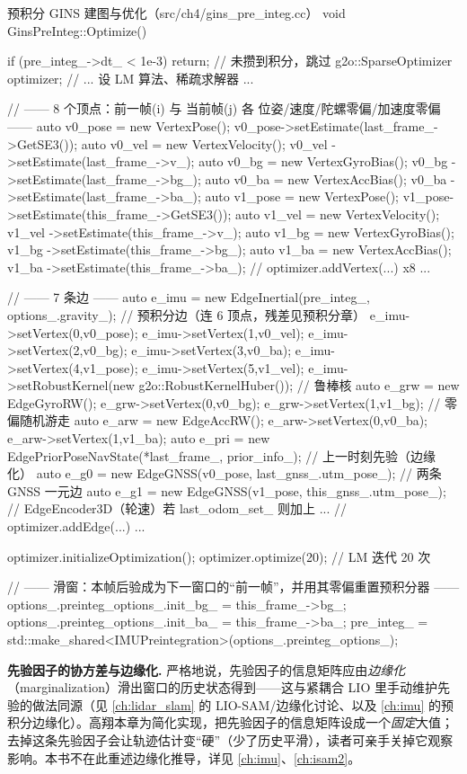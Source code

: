 \begin{codebox}[C++]{预积分 GINS 建图与优化（src/ch4/gins\_pre\_integ.cc）}
void GinsPreInteg::Optimize() {
  if (pre_integ_->dt_ < 1e-3) return;            // 未攒到积分，跳过
  g2o::SparseOptimizer optimizer;
  // ... 设 LM 算法、稀疏求解器 ...

  // —— 8 个顶点：前一帧(i) 与 当前帧(j) 各 位姿/速度/陀螺零偏/加速度零偏 ——
  auto v0_pose = new VertexPose();     v0_pose->setEstimate(last_frame_->GetSE3());
  auto v0_vel  = new VertexVelocity(); v0_vel ->setEstimate(last_frame_->v_);
  auto v0_bg   = new VertexGyroBias(); v0_bg  ->setEstimate(last_frame_->bg_);
  auto v0_ba   = new VertexAccBias();  v0_ba  ->setEstimate(last_frame_->ba_);
  auto v1_pose = new VertexPose();     v1_pose->setEstimate(this_frame_->GetSE3());
  auto v1_vel  = new VertexVelocity(); v1_vel ->setEstimate(this_frame_->v_);
  auto v1_bg   = new VertexGyroBias(); v1_bg  ->setEstimate(this_frame_->bg_);
  auto v1_ba   = new VertexAccBias();  v1_ba  ->setEstimate(this_frame_->ba_);
  // optimizer.addVertex(...) x8 ...

  // —— 7 条边 ——
  auto e_imu = new EdgeInertial(pre_integ_, options_.gravity_);   // 预积分边（连 6 顶点，残差见预积分章）
  e_imu->setVertex(0,v0_pose); e_imu->setVertex(1,v0_vel); e_imu->setVertex(2,v0_bg);
  e_imu->setVertex(3,v0_ba);   e_imu->setVertex(4,v1_pose); e_imu->setVertex(5,v1_vel);
  e_imu->setRobustKernel(new g2o::RobustKernelHuber());          // 鲁棒核
  auto e_grw = new EdgeGyroRW(); e_grw->setVertex(0,v0_bg); e_grw->setVertex(1,v1_bg); // 零偏随机游走
  auto e_arw = new EdgeAccRW();  e_arw->setVertex(0,v0_ba); e_arw->setVertex(1,v1_ba);
  auto e_pri = new EdgePriorPoseNavState(*last_frame_, prior_info_);                   // 上一时刻先验（边缘化）
  auto e_g0  = new EdgeGNSS(v0_pose, last_gnss_.utm_pose_);       // 两条 GNSS 一元边
  auto e_g1  = new EdgeGNSS(v1_pose, this_gnss_.utm_pose_);
  // EdgeEncoder3D（轮速）若 last_odom_set_ 则加上 ...
  // optimizer.addEdge(...) ...

  optimizer.initializeOptimization(); optimizer.optimize(20);    // LM 迭代 20 次

  // —— 滑窗：本帧后验成为下一窗口的“前一帧”，并用其零偏重置预积分器 ——
  options_.preinteg_options_.init_bg_ = this_frame_->bg_;
  options_.preinteg_options_.init_ba_ = this_frame_->ba_;
  pre_integ_ = std::make_shared<IMUPreintegration>(options_.preinteg_options_);
}
\end{codebox}

\begin{note}
\textbf{先验因子的协方差与边缘化.}\;
严格地说，先验因子的信息矩阵应由\emph{边缘化}（marginalization）滑出窗口的历史状态得到——这与紧耦合 LIO 里手动维护先验的做法同源（见 \cref{ch:lidar_slam} 的 LIO-SAM/边缘化讨论、以及 \cref{ch:imu} 的预积分边缘化）。高翔本章为简化实现，把先验因子的信息矩阵设成一个\emph{固定}大值；去掉这条先验因子会让轨迹估计变“硬”（少了历史平滑），读者可亲手关掉它观察影响\cite{gao2023slamad}。本书不在此重述边缘化推导，详见 \cref{ch:imu}、\cref{ch:isam2}。
\end{note}

